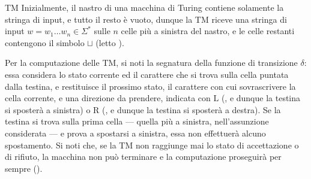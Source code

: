 \documentclass[a4paper, 12pt]{report}
\begin{document}
\begin{frameddefn}[label={tm},breakable]{TM}
        Inizialmente, il nastro di una macchina di Turing contiene solamente la stringa di input, e tutto il resto è vuoto, dunque la TM riceve una stringa di input $w = w_1 \ldots w_n \in \Sigma^*$ sulle $n$ celle più a sinistra del nastro, e le celle restanti contengono il simbolo $\sqcup$ (letto ).

        Per la computazione delle TM, si noti la segnatura della funzione di transizione $\delta$: essa considera lo stato corrente ed il carattere che si trova sulla cella puntata dalla testina, e restituisce il prossimo stato, il carattere con cui sovrascrivere la cella corrente, e una direzione da prendere, indicata con $\mathrm L$ (, e dunque la testina si sposterà a sinistra) o $\mathrm R$ (, e dunque la testina si sposterà a destra). Se la testina si trova sulla prima cella --- quella più a sinistra, nell'assunzione considerata --- e prova a spostarsi a sinistra, essa non effettuerà alcuno spostamento. Si noti che, se la TM non raggiunge mai lo stato di accettazione o di rifiuto, la macchina non può terminare e la computazione proseguirà per sempre ().
    \end{frameddefn}
\end{document}
